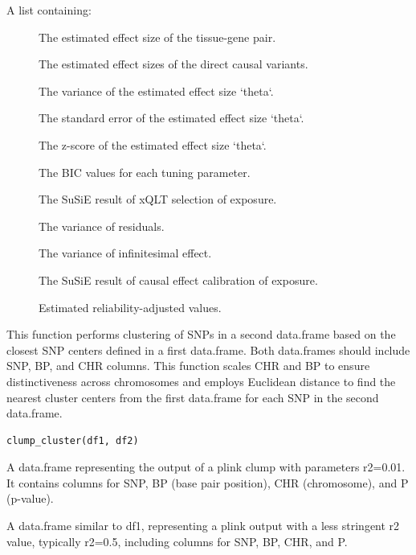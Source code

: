 \documentclass[a4paper]{book}
\begin{document}
\begin{Value}
A list containing:
\begin{description}

\item[] The estimated effect size of the tissue-gene pair.
\item[] The estimated effect sizes of the direct causal variants.
\item[] The variance of the estimated effect size `theta`.
\item[] The standard error of the estimated effect size `theta`.
\item[] The z-score of the estimated effect size `theta`.
\item[] The BIC values for each tuning parameter.
\item[] The SuSiE result of xQLT selection of exposure.
\item[] The variance of residuals.
\item[] The variance of infinitesimal effect.
\item[] The SuSiE result of causal effect calibration of exposure.
\item[] Estimated reliability-adjusted values.

\end{description}

\end{Value}
%
\begin{Description}
This function performs clustering of SNPs in a second data.frame based on the closest SNP centers defined in a first data.frame.
Both data.frames should include SNP, BP, and CHR columns. This function scales CHR and BP to ensure distinctiveness across chromosomes
and employs Euclidean distance to find the nearest cluster centers from the first data.frame for each SNP in the second data.frame.
\end{Description}
%
\begin{Usage}
\begin{verbatim}
clump_cluster(df1, df2)
\end{verbatim}
\end{Usage}
%
\begin{Arguments}
\begin{ldescription}
\item[\code{df1}] A data.frame representing the output of a plink clump with parameters r2=0.01.
It contains columns for SNP, BP (base pair position), CHR (chromosome), and P (p-value).

\item[\code{df2}] A data.frame similar to df1, representing a plink output with a less stringent r2 value, typically r2=0.5,
including columns for SNP, BP, CHR, and P.
\end{ldescription}
\end{Arguments}
\end{document}
